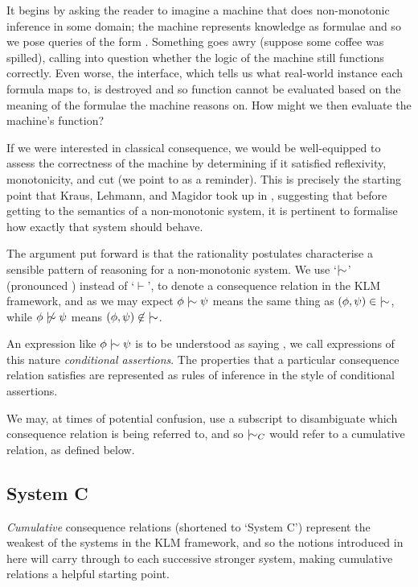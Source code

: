 It begins by asking the reader to imagine a machine that does non-monotonic inference in some domain; the machine represents knowledge as formulae and so we pose queries of the form . Something goes awry (suppose some coffee was spilled), calling into question whether the logic of the machine still functions correctly. Even worse, the interface, which tells us what real-world instance each formula maps to, is destroyed and so function cannot be evaluated based on the meaning of the formulae the machine reasons on. How might we then evaluate the machine's function?

If we were interested in classical consequence, we would be well-equipped to assess the correctness of the machine by determining if it satisfied reflexivity, monotonicity, and cut (we point to  as a reminder). This is precisely the starting point that Kraus, Lehmann, and Magidor took up in \cite{kraus1990nonmonotonic}, suggesting that before getting to the semantics of a non-monotonic system, it is pertinent to formalise how exactly that system should behave.

The argument put forward is that the rationality postulates characterise a sensible pattern of reasoning for a non-monotonic system. We use `$\twiddle$' (pronounced ) instead of `$\vdash $', to denote a consequence relation in the KLM framework, and as we may expect $\phi \twiddle \psi$ means the same thing as $(\phi, \psi) \in \; \twiddle$, while $\phi \ntwiddle \psi$ means $(\phi, \psi) \not \in \; \twiddle$.

An expression like $\phi \twiddle \psi$ is to be understood as saying , we call expressions of this nature \textit{conditional assertions}. The properties that a particular consequence relation satisfies are represented as rules of inference in the style of conditional assertions.

We may, at times of potential confusion, use a subscript to disambiguate which consequence relation is being referred to, and so $\twiddle_C$ would refer to a cumulative relation, as defined below.

\subsection{System C}
\label{subsection:system-c}
\textit{Cumulative} consequence relations (shortened to `System C') \cite{kraus1990nonmonotonic} represent the weakest of the systems in the KLM framework, and so the notions introduced in here will carry through to each successive stronger system, making cumulative relations a helpful starting point.

